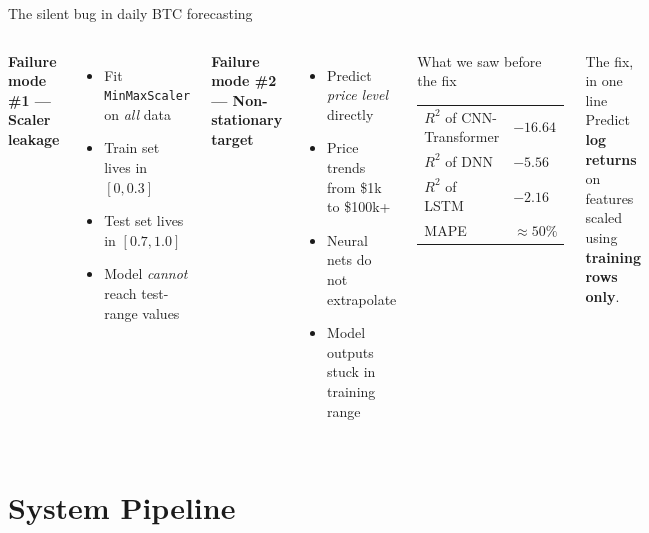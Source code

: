 \documentclass[aspectratio=169]{beamer}
\begin{document}
\begin{frame}{The silent bug in daily BTC forecasting}
\begin{columns}[T,onlytextwidth]
\textbf{Failure mode \#1 --- Scaler leakage}
\begin{itemize}
  \item Fit \texttt{MinMaxScaler} on \emph{all} data
  \item Train set lives in $[0, 0.3]$
  \item Test set lives in $[0.7, 1.0]$
  \item Model \emph{cannot} reach test-range values
\end{itemize}

\vspace{0.4cm}
\textbf{Failure mode \#2 --- Non-stationary target}
\begin{itemize}
  \item Predict \emph{price level} directly
  \item Price trends from \$1k to \$100k+
  \item Neural nets do not extrapolate
  \item Model outputs stuck in training range
\end{itemize}

\begin{alertblock}{What we saw before the fix}
\centering
\begin{tabular}{ll}
$R^2$ of CNN-Transformer & $-16.64$ \\
$R^2$ of DNN & $-5.56$ \\
$R^2$ of LSTM & $-2.16$ \\
MAPE & $\approx 50\%$
\end{tabular}
\end{alertblock}

\vspace{0.3cm}
\begin{block}{The fix, in one line}
Predict \textbf{log returns} on features scaled using \textbf{training rows only}.
\end{block}
\end{columns}
\end{frame}


\section{System Pipeline}
\end{document}

